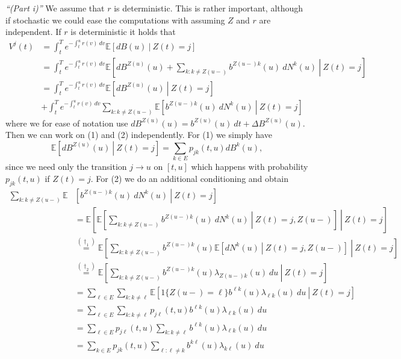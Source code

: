 \documentclass[
]{book}
\begin{document}
\emph{``(Part i)''} We assume that \(r\) is deterministic. This is rather important, although if stochastic we could ease the computations with assuming \(Z\) and \(r\) are independent. If \(r\) is deterministic it holds that
\begin{align*}
V^j(t)&=\int_t^Te^{-\int_t^ur(v)\ dv}\mathbb E\left[\left.dB(u) \ \right\vert\ Z(t)= j\right]\\
&=\int_t^Te^{-\int_t^ur(v)\ dv}\mathbb E\left[\left. dB^{Z(u)}(u)+\sum_{k:k\ne Z(u-)}b^{Z(u-)k}(u)\ dN^k(u) \ \right\vert\ Z(t)= j\right]\\
&=\int_t^Te^{-\int_t^ur(v)\ dv}\mathbb E\left[\left. dB^{Z(u)}(u) \ \right\vert\ Z(t)= j\right]\tag{1}\\
&+\int_t^Te^{-\int_t^ur(v)\ dv}\sum_{k:k\ne Z(u-)}\mathbb E\left[\left. b^{Z(u-)k}(u)\ dN^k(u) \ \right\vert\ Z(t)= j\right]\tag{2}
\end{align*}
where we for ease of notation use \(dB^{Z(u)}(u)=b^{Z(u)}(u)\ dt+\Delta B^{Z(u)}(u)\). Then we can work on (1) and (2) independently. For (1) we simply have
\[
\mathbb E\left[\left. dB^{Z(u)}(u) \ \right\vert\ Z(t)= j\right]=\sum_{k\in E}p_{jk}(t,u)d B^k(u),
\]
since we need only the transition \(j\to u\) on \([t,u]\) which happens with probability \(p_{jk}(t,u)\) if \(Z(t)=j\). For (2) we do an additional conditioning and obtain
\begin{align*}
\sum_{k:k\ne Z(u-)}\mathbb E&\left[\left. b^{Z(u-)k}(u)\ dN^k(u) \ \right\vert\ Z(t)= j\right]\\
&=\mathbb E\left[\left.\mathbb E\left[\left.\sum_{k:k\ne Z(u-)} b^{Z(u-)k}(u)\ dN^k(u) \ \right\vert\ Z(t)= j,Z(u-)\right]\ \right\vert\ Z(t)= j\right]\\
&\stackrel{(\dagger_1)}{=}\mathbb E\left[\left.\sum_{k:k\ne Z(u-)} b^{Z(u-)k}(u)\mathbb E\left[\left. dN^k(u) \ \right\vert\ Z(t)= j,Z(u-)\right]\ \right\vert\ Z(t)= j\right]\\
&\stackrel{(\dagger_2)}{=}\mathbb E\left[\left.\sum_{k:k\ne Z(u-)} b^{Z(u-)k}(u)\lambda_{Z(u-)k}(u)\ du\ \right\vert\ Z(t)= j\right]\\
&=\sum_{\ell\in E}\sum_{k:k\ne \ell}\mathbb E\left[\left.1\{Z(u-)=\ell\} b^{\ell k}(u)\lambda_{\ell k}(u)\ du\ \right\vert\ Z(t)= j\right]\\
&=\sum_{\ell\in E}\sum_{k:k\ne \ell} p_{j\ell}(t,u) b^{\ell k}(u)\lambda_{\ell k}(u)\ du\\
&=\sum_{\ell\in E}p_{j\ell}(t,u)\sum_{k:k\ne \ell}  b^{\ell k}(u)\lambda_{\ell k}(u)\ du\\
&=\sum_{k\in E}p_{jk}(t,u)\sum_{\ell :\ell \ne k}  b^{k\ell }(u)\lambda_{k\ell }(u)\ du
\end{align*}
\end{document}
